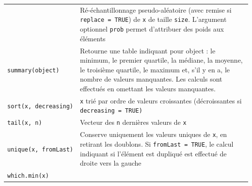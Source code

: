 \documentclass[
  11pt,
]{book}
\numberwithin{equation}{section}
\numberwithin{countremarque}{section}
\begin{document}
\begin{longtable}[]{@{}ll@{}}
\begin{minipage}[t]{0.41\columnwidth}
\end{minipage} & \begin{minipage}[t]{0.53\columnwidth}\raggedright
Ré-échantillonnage pseudo-aléatoire (avec remise si \texttt{replace\ =\ TRUE}) de \texttt{x} de taille \texttt{size}. L'argument optionnel \texttt{prob} permet d'attribuer des poids aux éléments\strut
\end{minipage}\tabularnewline
\begin{minipage}[t]{0.41\columnwidth}\raggedright
\texttt{summary(object)}\strut
\end{minipage} & \begin{minipage}[t]{0.53\columnwidth}\raggedright
Retourne une table indiquant pour object : le minimum, le premier quartile, la médiane, la moyenne, le troisième quartile, le maximum et, s'il y en a, le nombre de valeurs manquantes. Les calculs sont effectués en omettant les valeurs manquantes.\strut
\end{minipage}\tabularnewline
\begin{minipage}[t]{0.41\columnwidth}\raggedright
\texttt{sort(x,\ decreasing)}\strut
\end{minipage} & \begin{minipage}[t]{0.53\columnwidth}\raggedright
\texttt{x} trié par ordre de valeurs croissantes (décroissantes si \texttt{decreasing\ =\ TRUE)}\strut
\end{minipage}\tabularnewline
\begin{minipage}[t]{0.41\columnwidth}\raggedright
\texttt{tail(x,\ n)}\strut
\end{minipage} & \begin{minipage}[t]{0.53\columnwidth}\raggedright
Vecteur des \texttt{n} dernières valeurs de \texttt{x}\strut
\end{minipage}\tabularnewline
\begin{minipage}[t]{0.41\columnwidth}\raggedright
\texttt{unique(x,\ fromLast)}\strut
\end{minipage} & \begin{minipage}[t]{0.53\columnwidth}\raggedright
Conserve uniquement les valeurs uniques de \texttt{x}, en retirant les doublons. Si \texttt{fromLast\ =\ TRUE}, le calcul indiquant si l'élément est dupliqué est effectué de droite vers la gauche\strut
\end{minipage}\tabularnewline
\begin{minipage}[t]{0.41\columnwidth}\raggedright
\texttt{which.min(x)}\strut
\end{minipage} & \begin{minipage}[t]{0.53\columnwidth}\raggedright

\end{minipage}
\end{longtable}
\end{document}
